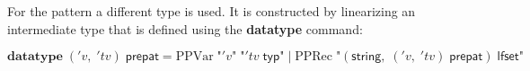     For the pattern a different type is used. It is constructed by linearizing an intermediate type  that is defined using the \textbf{datatype} command:
    
    \begin{equation*}
      \textbf{datatype}\; ('v,\; 'tv)\; \textsf{prepat} = \text{PPVar}\; \text{"}'v\text{"}\; \text{"}'tv\; \textsf{typ}\text{"}\; |\; \text{PPRec}\; \text{"}(\textsf{string},\; ('v,\; 'tv)\; \textsf{prepat})\; \textsf{lfset}\text{"}
    \end{equation*}

